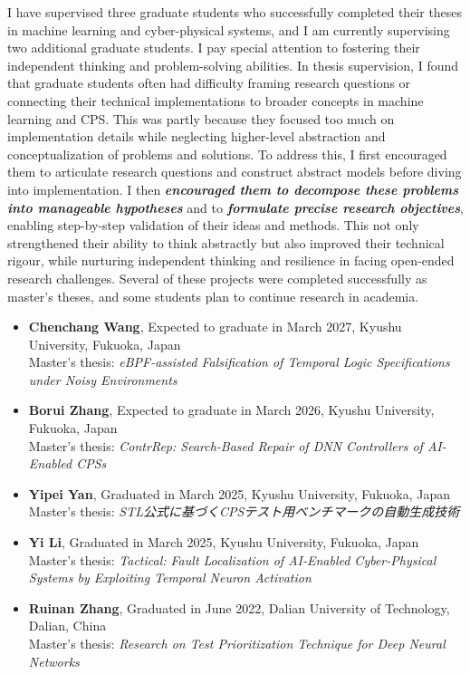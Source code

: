 \documentclass[11pt,a4paper]{moderncv}        %
\newcommand{\strongit}[1]{\textbf{\textit{#1}}}
\renewcommand{\headrulewidth}{0.4pt}       %
\newcommand{\supervisionentry}[5]{%
  \item \textbf{#1}, #2, #3, #4 \\ %
  {#5} %
}
\begin{document}
I have supervised three graduate students who successfully completed their theses in machine learning and cyber-physical systems, and I am currently supervising two additional graduate students. I pay special attention to fostering their independent thinking and problem-solving abilities. In thesis supervision, I found that graduate students often had difficulty framing research questions or connecting their technical implementations to broader concepts in machine learning and CPS. This was partly because they focused too much on implementation details while neglecting higher-level abstraction and conceptualization of problems and solutions. To address this, I first encouraged them to articulate research questions and construct abstract models before diving into implementation. I then \strongit{encouraged them to decompose these problems into manageable hypotheses} and to \strongit{formulate precise research objectives}, enabling step-by-step validation of their ideas and methods. This not only strengthened their ability to think abstractly but also improved their technical rigour, while nurturing independent thinking and resilience in facing open-ended research challenges. Several of these projects were completed successfully as master’s theses, and some students plan to continue research in academia.

\begin{itemize}
    \supervisionentry{Chenchang Wang}{Expected to graduate in March 2027}{Kyushu University}{Fukuoka, Japan}{Master's thesis: \emph{eBPF-assisted Falsification of Temporal Logic Specifications under Noisy Environments}}
    \supervisionentry{Borui Zhang}{Expected to graduate in March 2026}{Kyushu University}{Fukuoka, Japan}{Master's thesis: \emph{ContrRep: Search-Based Repair of DNN Controllers of AI-Enabled CPSs}}
    \supervisionentry{Yipei Yan}{Graduated in March 2025}{Kyushu University}{Fukuoka, Japan}{Master's thesis: \emph{STL公式に基づくCPSテスト用ベンチマークの自動生成技術}}
    \supervisionentry{Yi Li}{Graduated in March 2025}{Kyushu University}{Fukuoka, Japan}{Master's thesis: \emph{Tactical: Fault Localization of AI-Enabled Cyber-Physical Systems by Exploiting Temporal Neuron Activation}}
    \supervisionentry{Ruinan Zhang}{Graduated in June 2022}{Dalian University of Technology}{Dalian, China}{Master's thesis: \emph{Research on Test Prioritization Technique for Deep Neural Networks}}
\end{itemize}

\clearpage

\fancyhf{}
\renewcommand{\headrulewidth}{0.4pt}       %
\fancyhead[R]{\textcolor{gray}{\thepage}}        %
\end{document}
